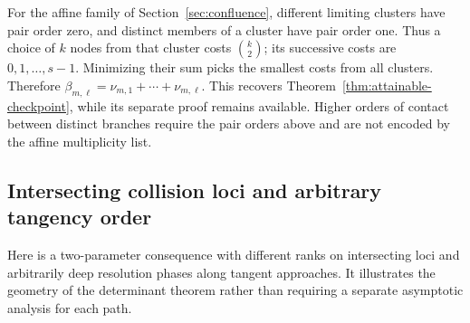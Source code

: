 For the affine family of Section~\ref{sec:confluence}, different limiting
clusters have pair order zero, and distinct members of a cluster have pair
order one. Thus a choice of $k$ nodes from that cluster costs
$\binom{k}{2}$; its successive costs are $0,1,\ldots,s-1$.
Minimizing their sum picks the smallest costs from all clusters. Therefore
$\beta_{m,\ell}=\nu_{m,1}+\cdots+\nu_{m,\ell}$. This recovers
Theorem~\ref{thm:attainable-checkpoint}, while its separate proof remains
available. Higher orders of contact between distinct branches require the
pair orders above and are not encoded by the affine multiplicity list.

\subsection{Intersecting collision loci and arbitrary tangency order}
Here is a two-parameter consequence with different ranks on intersecting
loci and arbitrarily deep resolution phases along tangent approaches.
It illustrates the geometry of the determinant theorem rather than
requiring a separate asymptotic analysis for each path.

